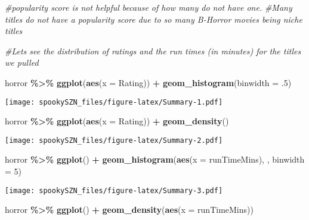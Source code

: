 \documentclass[
]{article}
\newenvironment{Shaded}{\begin{snugshade}}{\end{snugshade}}
\newcommand{\AttributeTok}[1]{\textcolor[rgb]{0.13,0.29,0.53}{#1}}
\newcommand{\CommentTok}[1]{\textcolor[rgb]{0.56,0.35,0.01}{\textit{#1}}}
\newcommand{\DecValTok}[1]{\textcolor[rgb]{0.00,0.00,0.81}{#1}}
\newcommand{\FunctionTok}[1]{\textcolor[rgb]{0.13,0.29,0.53}{\textbf{#1}}}
\newcommand{\NormalTok}[1]{#1}
\newcommand{\SpecialCharTok}[1]{\textcolor[rgb]{0.81,0.36,0.00}{\textbf{#1}}}
\begin{document}
\begin{Shaded}
\begin{Highlighting}[]
\CommentTok{\#popularity score is not helpful because of how many do not have one.}
\CommentTok{\#Many titles do not have a popularity score due to so many B{-}Horror movies being niche titles}

\CommentTok{\#Let\textquotesingle{}s see the distribution of ratings and the run times (in minutes) for the titles we pulled}

\NormalTok{horror }\SpecialCharTok{\%\textgreater{}\%}  
  \FunctionTok{ggplot}\NormalTok{(}\FunctionTok{aes}\NormalTok{(}\AttributeTok{x =}\NormalTok{ Rating)) }\SpecialCharTok{+}
  \FunctionTok{geom\_histogram}\NormalTok{(}\AttributeTok{binwidth =}\NormalTok{ .}\DecValTok{5}\NormalTok{)}
\end{Highlighting}
\end{Shaded}

\texttt{[image: spookySZN\_files/figure-latex/Summary-1.pdf]}

\begin{Shaded}
\begin{Highlighting}[]
\NormalTok{horror }\SpecialCharTok{\%\textgreater{}\%}  
  \FunctionTok{ggplot}\NormalTok{(}\FunctionTok{aes}\NormalTok{(}\AttributeTok{x =}\NormalTok{ Rating)) }\SpecialCharTok{+}
  \FunctionTok{geom\_density}\NormalTok{()}
\end{Highlighting}
\end{Shaded}

\texttt{[image: spookySZN\_files/figure-latex/Summary-2.pdf]}

\begin{Shaded}
\begin{Highlighting}[]
\NormalTok{horror }\SpecialCharTok{\%\textgreater{}\%} 
  \FunctionTok{ggplot}\NormalTok{() }\SpecialCharTok{+} 
  \FunctionTok{geom\_histogram}\NormalTok{(}\FunctionTok{aes}\NormalTok{(}\AttributeTok{x =}\NormalTok{ runTimeMins), , }\AttributeTok{binwidth =} \DecValTok{5}\NormalTok{)}
\end{Highlighting}
\end{Shaded}

\texttt{[image: spookySZN\_files/figure-latex/Summary-3.pdf]}

\begin{Shaded}
\begin{Highlighting}[]
\NormalTok{horror }\SpecialCharTok{\%\textgreater{}\%} 
  \FunctionTok{ggplot}\NormalTok{() }\SpecialCharTok{+} 
  \FunctionTok{geom\_density}\NormalTok{(}\FunctionTok{aes}\NormalTok{(}\AttributeTok{x =}\NormalTok{ runTimeMins))}
\end{Highlighting}
\end{Shaded}
\end{document}
